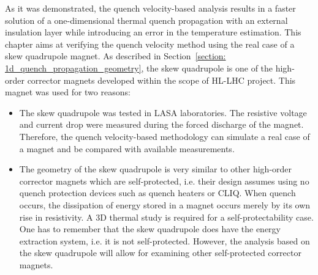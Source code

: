 As it was demonstrated, the quench velocity-based analysis results in a faster solution of a one-dimensional thermal quench propagation with an external insulation layer while introducing an error in the temperature estimation. This chapter aims at verifying the quench velocity method using the real case of a skew quadrupole magnet.
As described in Section~\ref{section: 1d_quench_propagation_geometry}, the skew quadrupole is one of the high-order corrector magnets developed within the scope of HL-LHC project. This magnet was used for two reasons: 
\begin{itemize}
    \item The skew quadrupole was tested in LASA laboratories. The resistive voltage and current drop were measured during the forced discharge of the magnet. Therefore, the quench velocity-based methodology can simulate a real case of a magnet and be compared with available measurements. 
    \item The geometry of the skew quadrupole is very similar to other high-order corrector magnets which are self-protected, i.e. their design assumes using no quench protection devices such as quench heaters or CLIQ. When quench occurs, the dissipation of energy stored in a magnet occurs merely by its own rise in resistivity. A 3D thermal study is required for a self-protectability case. One has to remember that the skew quadrupole does have the energy extraction system, i.e. it is not self-protected. However, the analysis based on the skew quadrupole will allow for examining other self-protected corrector magnets.
\end{itemize}

